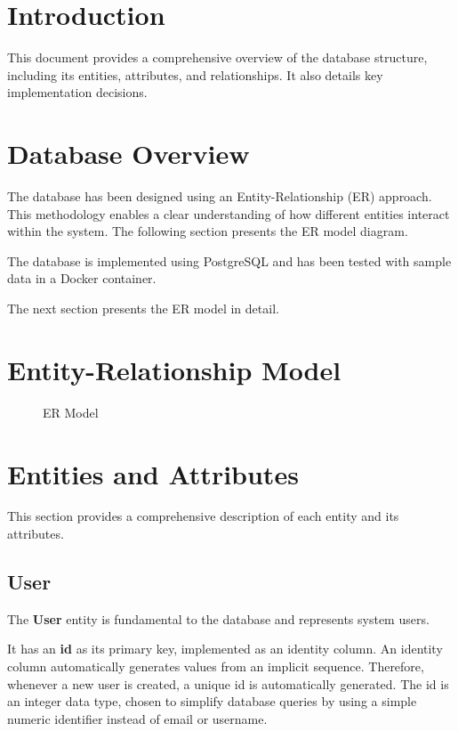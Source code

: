 \section{Introduction}
This document provides a comprehensive overview of the database structure, including its entities, attributes, and relationships. It also details key implementation decisions.

\section{Database Overview}
The database has been designed using an Entity-Relationship (ER) approach. This methodology enables a clear understanding of how different entities interact within the system. The following section presents the ER model diagram.

The database is implemented using PostgreSQL and has been tested with sample data in a Docker container.

The next section presents the ER model in detail.

\section{Entity-Relationship Model}
\begin{figure}[H]
    \centering
    
    \caption{ER Model}
    \label{fig:api_detailed_architecture}
\end{figure}

\section{Entities and Attributes}
This section provides a comprehensive description of each entity and its attributes.

\subsection{User}
The \textbf{User} entity is fundamental to the database and represents system users.

It has an \textbf{id} as its primary key, implemented as an identity column. An identity column automatically generates values from an implicit sequence. Therefore, whenever a new user is created, a unique id is automatically generated. The id is an integer data type, chosen to simplify database queries by using a simple numeric identifier instead of email or username.

